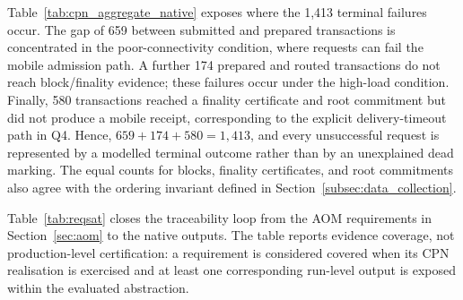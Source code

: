 \documentclass[a4paper,fleqn]{cas-sc}
\begin{document}


Table~\ref{tab:cpn_aggregate_native} exposes where the 1,413 terminal failures
occur. The gap of 659 between submitted and prepared transactions is
concentrated in the poor-connectivity condition, where requests can fail the
mobile admission path. A further 174 prepared and routed transactions do not reach block/finality evidence; these failures occur under the high-load
condition. Finally, 580 transactions reached a finality certificate and root
commitment but did not produce a mobile receipt, corresponding to the explicit
delivery-timeout path in Q4. Hence,
$659+174+580=1{,}413$, and every unsuccessful request is represented by a
modelled terminal outcome rather than by an unexplained dead marking. The equal
counts for blocks, finality certificates, and root commitments also agree with
the ordering invariant defined in Section~\ref{subsec:data_collection}.

Table~\ref{tab:reqsat} closes the traceability loop from the AOM requirements in
Section~\ref{sec:aom} to the native outputs. The table reports evidence coverage,
not production-level certification: a requirement is considered covered when
its CPN realisation is exercised and at least one corresponding run-level output
is exposed within the evaluated abstraction.
\end{document}
